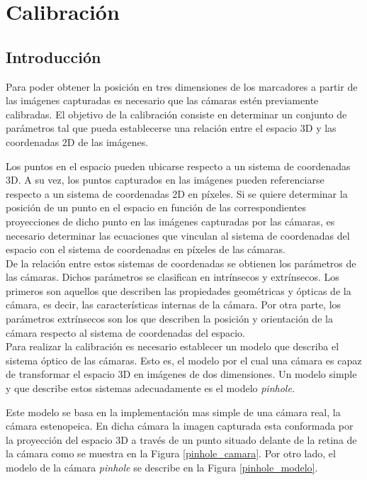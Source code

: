 \chapter{Calibración}\label{calibracion}


\section{Introducción}
Para poder obtener la posición en tres dimensiones de los marcadores a partir de las imágenes capturadas es necesario que las cámaras estén previamente calibradas. El objetivo de la calibración consiste en determinar un conjunto de parámetros tal que pueda establecerse una relación entre el espacio 3D y las coordenadas 2D de las imágenes.\\
\vspace{-0.1cm}


Los puntos en el espacio pueden ubicarse respecto a un sistema de coordenadas 3D. A su vez, los puntos capturados en las imágenes pueden referenciarse respecto a un sistema de coordenadas 2D en píxeles. Si se quiere determinar la posición de un punto en el espacio en función de las correspondientes proyecciones de dicho punto en las imágenes capturadas por las cámaras, es necesario determinar las ecuaciones que vinculan al sistema de coordenadas del espacio con el sistema de coordenadas en píxeles de las cámaras.\\

De la relación entre estos sistemas de coordenadas se obtienen los parámetros de las cámaras. Dichos parámetros se clasifican en intrínsecos y extrínsecos. Los primeros son aquellos que describen las propiedades geométricas y ópticas de la cámara, es decir, las características internas de la cámara. Por otra parte, los parámetros extrínsecos son los que describen la posición y orientación de la cámara respecto al sistema de coordenadas del espacio.\\

Para realizar la calibración es necesario establecer un modelo que describa el sistema óptico de las cámaras. Esto es, el modelo por el cual una cámara es capaz de transformar el espacio 3D en imágenes de dos dimensiones. Un modelo simple y que describe estos sistemas adecuadamente es el modelo \textit{pinhole}.

Este modelo se basa en la implementación mas simple de una cámara real, la cámara estenopeica. En dicha cámara la imagen capturada esta conformada por la proyección del espacio 3D a través de un punto situado delante de la retina de la cámara como se muestra en la Figura \ref{pinhole_camara}. Por otro lado, el modelo de la cámara \textit{pinhole} se describe en la Figura \ref{pinhole_modelo}.\\


